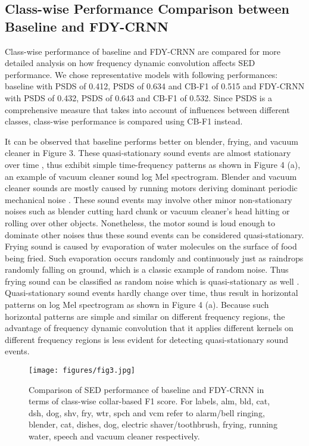 \documentclass[a4paper]{article}
\begin{document}
\subsection{Class-wise Performance Comparison between Baseline and FDY-CRNN}

\vspace{-5pt}
Class-wise performance of baseline and FDY-CRNN are compared for more detailed analysis on how frequency dynamic convolution affects SED performance. We chose representative models with following performances: baseline with PSDS of 0.412, PSDS of 0.634 and CB-F1 of 0.515 and FDY-CRNN with PSDS of 0.432, PSDS of 0.643 and CB-F1 of 0.532. Since PSDS is a comprehensive measure that takes into account of influences between different classes, class-wise performance is compared using CB-F1 instead.

It can be observed that baseline performs better on blender, frying, and vacuum cleaner in Figure 3. These quasi-stationary sound events are almost stationary over time \cite{randomdata}, thus exhibit simple time-frequency patterns as shown in Figure 4 (a), an example of vacuum cleaner sound log Mel spectrogram. Blender and vacuum cleaner sounds are mostly caused by running motors deriving dominant periodic mechanical noise \cite{vibration}. These sound events may involve other minor non-stationary noises such as blender cutting hard chunk or vacuum cleaner’s head hitting or rolling over other objects. Nonetheless, the motor sound is loud enough to dominate other noises thus these sound events can be considered quasi-stationary. Frying sound is caused by evaporation of water molecules on the surface of food being fried. Such evaporation occurs randomly and continuously just as raindrops randomly falling on ground, which is a classic example of random noise. Thus frying sound can be classified as random noise which is quasi-stationary as well \cite{randomdata}. Quasi-stationary sound events hardly change over time, thus result in horizontal patterns on log Mel spectrogram as shown in Figure 4 (a). Because such horizontal patterns are simple and similar on different frequency regions, the advantage of frequency dynamic convolution that it applies different kernels on different frequency regions is less evident for detecting quasi-stationary sound events.

\begin{figure}[t]
\centerline{\texttt{[image: figures/fig3.jpg]}}
\vspace{-5pt}
\caption{Comparison of SED performance of baseline and FDY-CRNN in terms of class-wise collar-based F1 score. For labels, alm, bld, cat, dsh, dog, shv, fry, wtr, spch and vcm refer to alarm/bell ringing, blender, cat, dishes, dog, electric shaver/toothbrush, frying, running water, speech and vacuum cleaner respectively.}
\label{fig:classwisef1}
\vspace{-15pt}
\end{figure}
\end{document}
